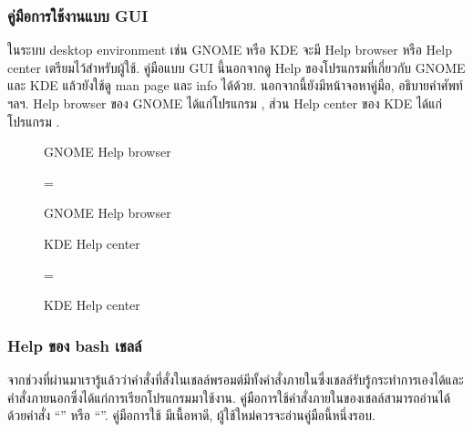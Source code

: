 \begin{thwbr}
\subsubsection{คู่มือการใช้งานแบบ GUI}
ในระบบ desktop environment เช่น GNOME หรือ KDE จะมี Help browser หรือ Help center เตรียมไว้สำหรับผู้ใช้. คู่มือแบบ GUI นี้นอกจากดู Help ของโปรแกรมที่เกี่ยวกับ GNOME และ KDE แล้วยังใช้ดู man page และ info ได้ด้วย. นอกจากนี้ยังมีหน้าจอหาคู่มือ, อธิบายคำศัพท์ ฯลฯ. Help browser ของ GNOME ได้แก่โปรแกรม , ส่วน Help center ของ KDE ได้แก่โปรแกรม . 


\begin{figure}[t]
\ifthenelse{\isodd{\pageref{fig:yelp}}}%
{\parbox{\headwidth}{\center{}\caption{GNOME Help browser}\label{fig:yelp}}}%
{\leftskip=\moveback\parbox{\headwidth}{\center{}\caption{GNOME Help browser}\label{fig:yelp}}}
\end{figure}

\begin{figure}[t]
\ifthenelse{\isodd{\pageref{fig:khelpcenter}}}%
{\parbox{\headwidth}{\center{}\caption{KDE Help center}\label{fig:khelpcenter}}}%
{\leftskip=\moveback\parbox{\headwidth}{\center{}\caption{KDE Help center}\label{fig:khelpcenter}}}
\end{figure}


\subsubsection{Help ของ bash เชลล์}
จากช่วงที่ผ่านมาเรารู้แล้วว่าคำสั่งที่สั่งในเชลล์พรอมต์มีทั้งคำสั่งภายในซึ่งเชลล์รับรู้กระทำการเองได้และคำสั่งภายนอกซึ่งได้แก่การเรียกโปรแกรมมาใช้งาน. คู่มือการใช้คำสั่งภายในของเชลล์สามารถอ่านได้ด้วยคำสั่ง ``'' หรือ ``''. คู่มือการใช้  มีเนื้อหาดี, ผู้ใช้ใหม่ควรจะอ่านคู่มือนี้หนึ่งรอบ.


\end{thwbr}
